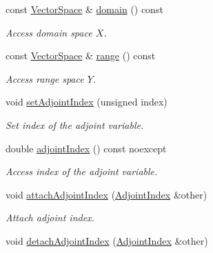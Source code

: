\begin{DoxyCompactItemize}
const \hyperlink{classSpacy_1_1VectorSpace}{Vector\+Space} \& \hyperlink{classSpacy_1_1OperatorBase_a2588f9b3e0188820c4c494e63293dc6f_a2588f9b3e0188820c4c494e63293dc6f}{domain} () const 
\begin{DoxyCompactList}\small\item\em Access domain space $X$. \end{DoxyCompactList}\item 
const \hyperlink{classSpacy_1_1VectorSpace}{Vector\+Space} \& \hyperlink{classSpacy_1_1OperatorBase_ab19d3b7a6f290b1079248f1e567e53d6_ab19d3b7a6f290b1079248f1e567e53d6}{range} () const 
\begin{DoxyCompactList}\small\item\em Access range space $Y$. \end{DoxyCompactList}\item 
void \hyperlink{classSpacy_1_1Mixin_1_1AdjointIndex_a30d4dd8b61175144c84c5bbf964528d7_a30d4dd8b61175144c84c5bbf964528d7}{set\+Adjoint\+Index} (unsigned index)
\begin{DoxyCompactList}\small\item\em Set index of the adjoint variable. \end{DoxyCompactList}\item 
double \hyperlink{classSpacy_1_1Mixin_1_1AdjointIndex_afd5c0f6bd67d20c88ea65b7f8fe4ab45_afd5c0f6bd67d20c88ea65b7f8fe4ab45}{adjoint\+Index} () const noexcept
\begin{DoxyCompactList}\small\item\em Access index of the adjoint variable. \end{DoxyCompactList}\item 
void \hyperlink{classSpacy_1_1Mixin_1_1AdjointIndex_a6ac8bb62f7d40cdf7aee68539026a647_a6ac8bb62f7d40cdf7aee68539026a647}{attach\+Adjoint\+Index} (\hyperlink{classSpacy_1_1Mixin_1_1AdjointIndex_a18dca16025bfc2af67da2eee34be9699_a18dca16025bfc2af67da2eee34be9699}{Adjoint\+Index} \&other)
\begin{DoxyCompactList}\small\item\em Attach adjoint index. \end{DoxyCompactList}\item 
\hypertarget{classSpacy_1_1Mixin_1_1AdjointIndex_af07504e2900cd83446469b4bb0ce0a4a}{}void \hyperlink{classSpacy_1_1Mixin_1_1AdjointIndex_af07504e2900cd83446469b4bb0ce0a4a}{detach\+Adjoint\+Index} (\hyperlink{classSpacy_1_1Mixin_1_1AdjointIndex_a18dca16025bfc2af67da2eee34be9699_a18dca16025bfc2af67da2eee34be9699}{Adjoint\+Index} \&other)\label{classSpacy_1_1Mixin_1_1AdjointIndex_af07504e2900cd83446469b4bb0ce0a4a}


\end{DoxyCompactItemize}
